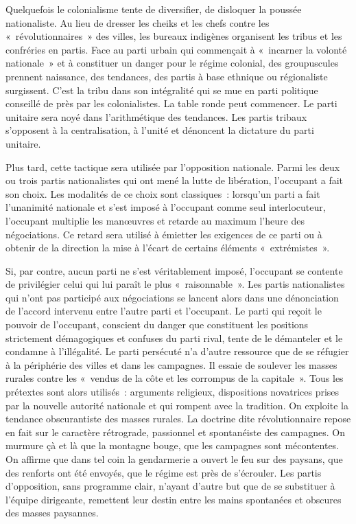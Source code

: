 \documentclass[french,twoside]{book} %
\begin{document}
\bigbreak
\noindent Quelquefois le colonialisme tente de diversifier, de disloquer la poussée nationaliste. Au lieu de dresser les cheiks et les chefs contre les « révolutionnaires » des villes, les bureaux indigènes   organisent les tribus et les confréries en partis. Face au parti urbain qui commençait à « incarner la volonté nationale » et à constituer un danger pour le régime colonial, des groupuscules prennent naissance, des tendances, des partis à base ethnique ou régionaliste surgissent. C’est la tribu dans son intégralité qui se mue en parti politique conseillé de près par les colonialistes. La table ronde peut commencer. Le parti unitaire sera noyé dans l’arithmétique des tendances. Les partis tribaux s’opposent à la centralisation, à l’unité et dénoncent la dictature du parti unitaire.\par
Plus tard, cette tactique sera utilisée par l’opposition nationale. Parmi les deux ou trois partis nationalistes qui ont mené la lutte de libération, l’occupant a fait son choix. Les modalités de ce choix sont classiques : lorsqu’un parti a fait l’unanimité nationale et s’est imposé à l’occupant comme seul interlocuteur, l’occupant multiplie les manœuvres et retarde au maximum l’heure des négociations. Ce retard sera utilisé à émietter les exigences de ce parti ou à obtenir de la direction la mise à l’écart de certains éléments « extrémistes ».\par
\bigbreak
\noindent Si, par contre, aucun parti ne s’est véritablement imposé, l’occupant se contente de privilégier celui qui lui paraît le plus « raisonnable ». Les partis nationalistes qui n’ont pas participé aux négociations se lancent alors dans une dénonciation de l’accord intervenu entre l’autre parti et l’occupant. Le parti qui reçoit le pouvoir de l’occupant, conscient du danger que constituent les positions strictement démagogiques et confuses du parti rival, tente de le démanteler et le condamne à l’illégalité. Le parti persécuté n’a d’autre ressource que de se réfugier à la périphérie des villes et dans les campagnes. Il essaie de soulever les masses rurales contre les « vendus de la côte et les corrompus de la capitale ». Tous les prétextes sont alors utilisés : arguments religieux, dispositions novatrices prises par la nouvelle autorité nationale et qui rompent avec la tradition. On exploite la tendance obscurantiste des masses rurales. La doctrine dite révolutionnaire repose en fait sur le caractère rétrograde, passionnel   et spontanéiste des campagnes. On murmure çà et là que la montagne bouge, que les campagnes sont mécontentes. On affirme que dans tel coin la gendarmerie a ouvert le feu sur des paysans, que des renforts ont été envoyés, que le régime est près de s’écrouler. Les partis d’opposition, sans programme clair, n’ayant d’autre but que de se substituer à l’équipe dirigeante, remettent leur destin entre les mains spontanées et obscures des masses paysannes.\par
\end{document}
